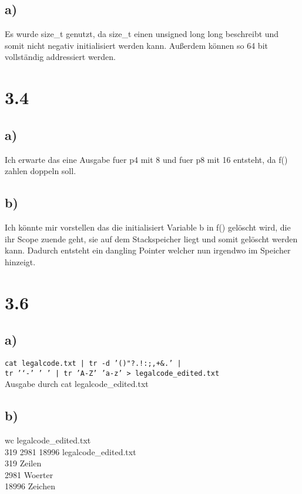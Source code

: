 \documentclass[a4paper,12pt]{article}
\begin{document}
\subsection*{a)}

Es wurde size\_t genutzt, da size\_t einen unsigned long long beschreibt und somit nicht negativ initialisiert werden kann. Außerdem
können so 64 bit vollständig addressiert werden. 


\section*{3.4}
\subsection*{a)}

Ich erwarte das eine Ausgabe fuer p4 mit 8 und fuer p8 mit 16 entsteht, da f() zahlen doppeln soll.

\subsection*{b)}

Ich könnte mir vorstellen das die initialisiert Variable b in f() gelöscht wird, die ihr Scope zuende geht, sie auf dem Stackspeicher liegt und somit
gelöscht werden kann. Dadurch entsteht ein dangling Pointer welcher nun irgendwo im Speicher hinzeigt.

\section*{3.6}

\subsection*{a)}
\texttt{cat legalcode.txt | tr -d '()"?.!:;,+\&.' | \\
tr '`-' ' ' | tr 'A-Z' 'a-z' > legalcode\_edited.txt} \\
Ausgabe durch cat legalcode\_edited.txt

\subsection*{b)}
wc legalcode\_edited.txt \\
319 2981 18996 legalcode\_edited.txt \\
319 Zeilen \\
2981 Woerter \\
18996 Zeichen \\
\end{document}
